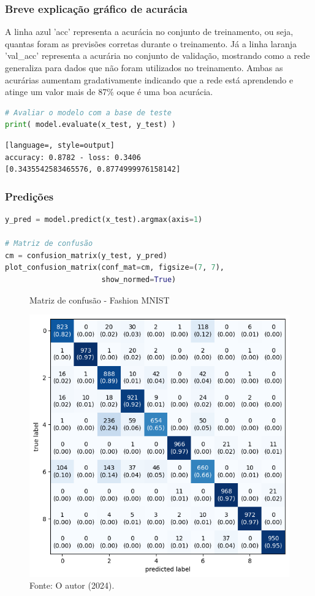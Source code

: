 \subsubsection*{Breve explicação gráfico de acurácia}
A linha azul 'acc' representa a acurácia no conjunto de treinamento, ou seja, quantas foram as previsões corretas durante o treinamento. Já a linha laranja 'val\_acc' representa a acurária no conjunto de validação, mostrando como a rede generaliza para dados que não foram utilizados no treinamento. Ambas as acurárias aumentam gradativamente indicando que a rede está aprendendo e atinge um valor mais de 87\% oque é uma boa acurácia.
\begin{lstlisting}[language=Python, style=input]
# Avaliar o modelo com a base de teste
print( model.evaluate(x_test, y_test) )
\end{lstlisting}
\begin{lstlisting}[language=, style=output]
accuracy: 0.8782 - loss: 0.3406
[0.3435542583465576, 0.8774999976158142]
\end{lstlisting}
\subsubsection*{Predições}
\begin{lstlisting}[language=Python, style=input]
y_pred = model.predict(x_test).argmax(axis=1)

# Matriz de confusão
cm = confusion_matrix(y_test, y_pred)
plot_confusion_matrix(conf_mat=cm, figsize=(7, 7),
                      show_normed=True)
\end{lstlisting}
\begin{figure}[H]
\centering
\caption{Matriz de confusão - Fashion MNIST}
\includegraphics[width=.8\linewidth]{apendices/fig/13_IAA012_3.png}
\caption*{Fonte: O autor (2024).}
\end{figure}
